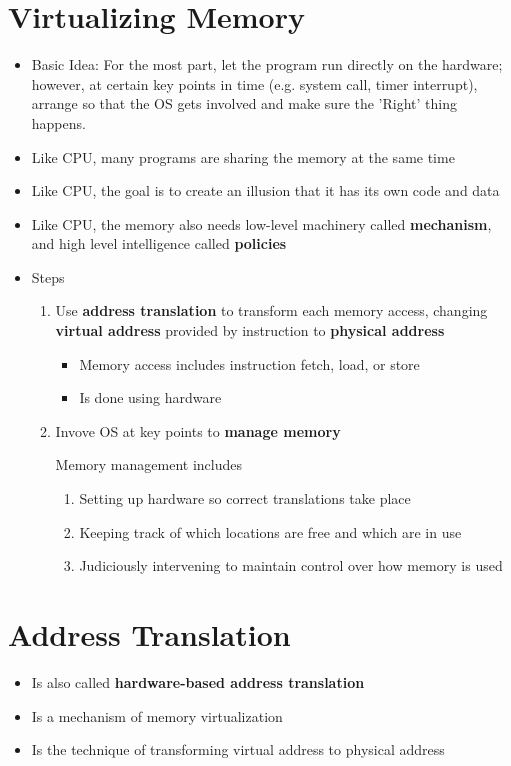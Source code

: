 \documentclass[12pt]{article}
\begin{document}
\section{Virtualizing Memory}
\begin{itemize}
    \item Basic Idea: For the most part, let the program run directly on the hardware;
    however, at certain key points in time (e.g. system call, timer interrupt), arrange
    so that the OS gets involved and make sure the 'Right' thing happens.
    \item Like CPU, many programs are sharing the memory at the same time
    \item Like CPU, the goal is to create an illusion that it has its own code and data
    \item Like CPU, the memory also needs low-level machinery called \textbf{mechanism},
    and high level intelligence called \textbf{policies}
    \item Steps

    \begin{enumerate}[1.]
        \item Use \textbf{address translation} to transform each memory access,
        changing \textbf{virtual address} provided by instruction to \textbf{physical address}
        \begin{itemize}
            \item Memory access includes instruction fetch, load, or store
            \item Is done using hardware
        \end{itemize}
        \item Invove OS at key points to \textbf{manage memory}

        \bigskip

        Memory management includes

        \bigskip

        \begin{enumerate}[1.]
            \item Setting up hardware so correct translations take place
            \item Keeping track of which locations are free and which are in use
            \item Judiciously intervening to maintain control over how memory is used
        \end{enumerate}

        \bigskip
    \end{enumerate}
\end{itemize}

\section{Address Translation}

\begin{itemize}
    \item Is also called \textbf{hardware-based address translation}
    \item Is a mechanism of memory virtualization
    \item Is the technique of transforming virtual address to physical address
\end{itemize}
\end{document}
